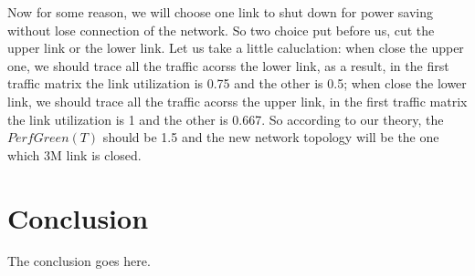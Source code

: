 \documentclass[conference]{IEEEtran}
\begin{document}
Now for some reason, we will choose one link to shut down for power saving without lose connection of the network. 
So two choice put before us, cut the upper link or the lower link. Let us take a little caluclation: when 
close the upper one, we should trace all the traffic acorss the lower link, as a result, in the first traffic 
matrix the link utilization is 0.75 and the other is 0.5; when close the lower link, we should trace all the 
traffic acorss the upper link, in the first traffic matrix the link utilization is 1 and the other is 0.667. 
So according to our theory, the $PerfGreen(T)$ should be 1.5 and the new network topology will be the one which 3M 
link is closed.


\section{Conclusion}
The conclusion goes here.


\end{document}
